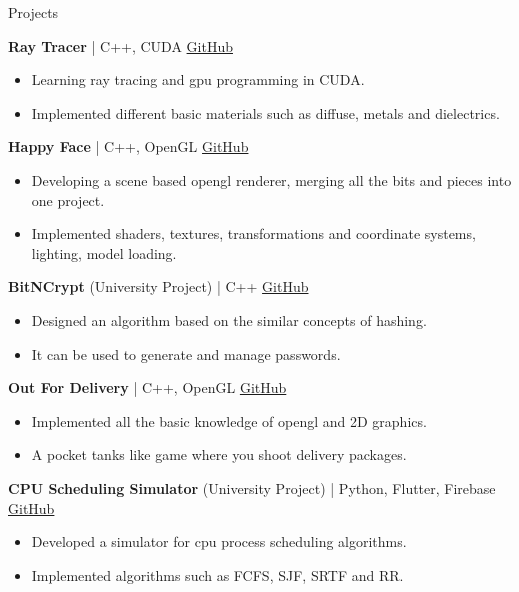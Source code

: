 \documentclass{resume}
\begin{document}
\begin{rSection}{Projects}
\vspace{-1em}
    \item \textbf{Ray Tracer} | {C++, CUDA}
    \hfill \href{https://github.com/JayNakum/LearningRayTracing}{GitHub}
    \begin{itemize}
        \setlength\itemsep{-0.5em}
        \item Learning ray tracing and gpu programming in CUDA.
        \item Implemented different basic materials such as diffuse, metals and dielectrics.
    \end{itemize}

    \item \textbf{Happy Face} | {C++, OpenGL}
    \hfill \href{https://github.com/JayNakum/HappyFace}{GitHub}
    \begin{itemize}
        \setlength\itemsep{-0.5em}
        \item Developing a scene based opengl renderer, merging all the bits and pieces into one project.
        \item Implemented shaders, textures, transformations and coordinate systems, lighting, model loading.
    \end{itemize}

    \item \textbf{BitNCrypt} (University Project) | {C++}
    \hfill \href{https://github.com/JayNakum/BitNCrypt}{GitHub}
    \begin{itemize}
        \setlength\itemsep{-0.5em}
        \item Designed an algorithm based on the similar concepts of hashing.
        \item It can be used to generate and manage passwords.
    \end{itemize}

    \item \textbf{Out For Delivery} | {C++, OpenGL}
    \hfill \href{https://github.com/JayNakum/OutForDelivery}{GitHub}
    \begin{itemize}
        \setlength\itemsep{-0.5em}
        \item Implemented all the basic knowledge of opengl and 2D graphics.
        \item A pocket tanks like game where you shoot delivery packages.
    \end{itemize}

    \item \textbf{CPU Scheduling Simulator} (University Project) | {Python, Flutter, Firebase}
    \hfill \href{https://github.com/JayNakum/OperatingSystemsProject}{GitHub}
    \begin{itemize}
        \setlength\itemsep{-0.5em}
        \item Developed a simulator for cpu process scheduling algorithms.
        \item Implemented algorithms such as FCFS, SJF, SRTF and RR.
    \end{itemize}


\end{rSection}
\end{document}
